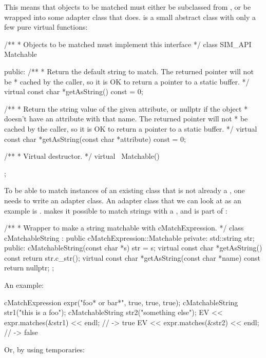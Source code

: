 This means that objects to be matched must either be subclassed from
, or be wrapped into some adapter class
that does.  is a small abstract class
with only a few pure virtual functions:

\begin{cpp}
/**
 * Objects to be matched must implement this interface
 */
class SIM_API Matchable
{
  public:
    /**
     * Return the default string to match. The returned pointer will not be
     * cached by the caller, so it is OK to return a pointer to a static buffer.
     */
    virtual const char *getAsString() const = 0;

    /**
     * Return the string value of the given attribute, or nullptr if the object
     * doesn't have an attribute with that name. The returned pointer will not
     * be cached by the caller, so it is OK to return a pointer to a static buffer.
     */
    virtual const char *getAsString(const char *attribute) const = 0;

    /**
     * Virtual destructor.
     */
    virtual ~Matchable() {}
};
\end{cpp}

To be able to match instances of an existing class that is not already a
, one needs to write an adapter class. An adapter class that
we can look at as an example is . 
makes it possible to match strings with a , and is part
of {\opp}:

\begin{cpp}
/**
 * Wrapper to make a string matchable with cMatchExpression.
 */
class cMatchableString : public cMatchExpression::Matchable
{
  private:
    std::string str;
  public:
    cMatchableString(const char *s) {str = s;}
    virtual const char *getAsString() const {return str.c_str();}
    virtual const char *getAsString(const char *name) const {return nullptr;}
};
\end{cpp}

An example:

\begin{cpp}
cMatchExpression expr("foo* or bar*", true, true, true);
cMatchableString str1("this is a foo");
cMatchableString str2("something else");
EV << expr.matches(&str1) << endl; // -> true
EV << expr.matches(&str2) << endl; // -> false
\end{cpp}

Or, by using temporaries:

